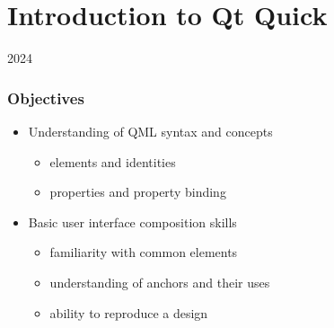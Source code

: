 %
%
%
%

\section{Introduction to Qt Quick}

\begin{slide}{2024}\frametitle{Objectives}

\begin{itemize}
\item Understanding of QML syntax and concepts
  \begin{itemize}
  \item elements and identities
  \item properties and property binding
  \end{itemize}
\item Basic user interface composition skills
  \begin{itemize}
  \item familiarity with common elements
  \item understanding of anchors and their uses
  \item ability to reproduce a design
  \end{itemize}
\end{itemize}

\end{slide}



